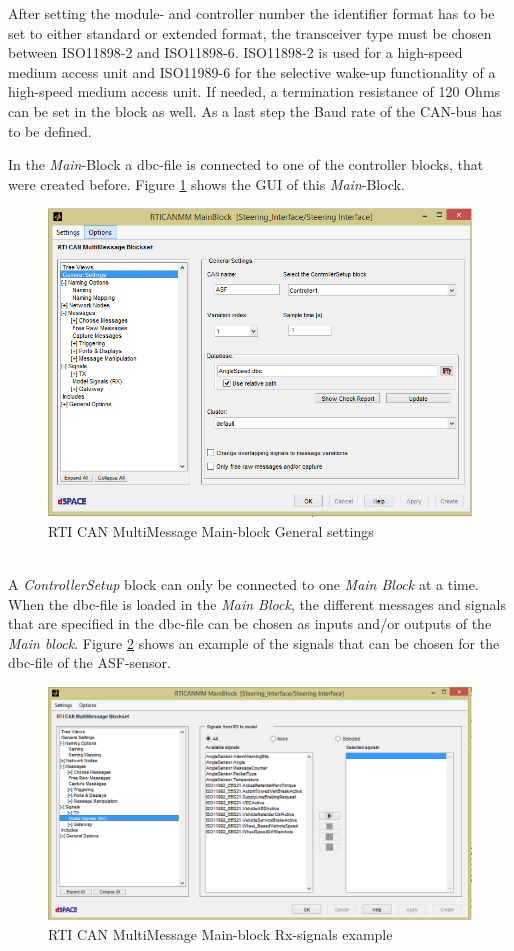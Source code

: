 \documentclass[ExampleMasters.tex]{subfiles}
\begin{document}
After setting the module- and controller number the identifier format has to be set to either standard or extended format, the transceiver type must be chosen between ISO11898-2 and ISO11898-6. ISO11898-2 is used for a high-speed medium access unit and ISO11989-6 for the selective wake-up functionality of a high-speed medium access unit. If needed, a termination resistance of 120 Ohms can be set in the block as well. As a last step the Baud rate of the \gls{CAN}-bus has to be defined.




In the \textit{Main}-Block a \gls{dbc}-file is connected to one of the controller blocks, that were created before. Figure \ref{fig:RTI_Main} shows the \gls{GUI} of this \textit{Main}-Block. 
\begin{figure}[!htb]
	\centering
	\includegraphics[width=0.5\linewidth]{figures/RTI_Main}
	
	\caption[\acrshort{RTI} \acrshort{CAN} MultiMessage Main-block General settings]{\gls{RTI} \gls{CAN} MultiMessage Main-block General settings}
	\label{fig:RTI_Main}
\end{figure} \\
A \textit{ControllerSetup} block can only be connected to one \textit{Main Block} at a time. When the \gls{dbc}-file is loaded in the \textit{Main Block}, the different messages and signals that are specified in the \gls{dbc}-file can be chosen as inputs and/or outputs of the \textit{Main block}. Figure \ref{fig:RTI_Main_signals} shows an example of the signals that can be chosen for the \gls{dbc}-file of the \gls{ASF}-sensor.  
\begin{figure}[!htb]
	\centering
	\includegraphics[width=0.5\linewidth]{figures/RTI_Main_signals}
	
	\caption[\acrshort{RTI} \acrshort{CAN} MultiMessage Main-block Rx-signals example]{\gls{RTI} \gls{CAN} MultiMessage Main-block Rx-signals example}
	\label{fig:RTI_Main_signals}
\end{figure} \\
\end{document}
